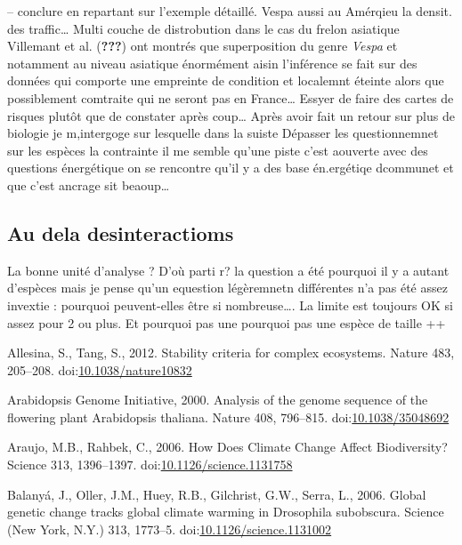 -- conclure en repartant sur l'exemple détaillé. Vespa aussi au Amérqieu
la densit. des traffic\ldots{} Multi couche de distrobution dans le cas
du frelon asiatique Villemant et al. ({\textbf{???}}) ont montrés que
superposition du genre \emph{Vespa} et notamment au niveau asiatique
énormément aisin l'inférence se fait sur des données qui comporte une
empreinte de condition et localemnt éteinte alors que possiblement
comtraite qui ne seront pas en France\ldots{} Essyer de faire des cartes
de risques plutôt que de constater après coup\ldots{} Après avoir fait
un retour sur plus de biologie je m,intergoge sur lesquelle dans la
suiste Dépasser les questionnemnet sur les espèces la contrainte il me
semble qu'une piste c'est aouverte avec des questions énergétique on se
rencontre qu'il y a des base én.ergétiqe dcommunet et que c'est ancrage
sit beaoup\ldots{}

\subsection{Au dela desinteractioms}\label{au-dela-desinteractioms}

La bonne unité d'analyse ? D'où parti r? la question a été pourquoi il y
a autant d'espèces mais je pense qu'un equestion légèremnetn différentes
n'a pas été assez invextie : pourquoi peuvent-elles être si
nombreuse\ldots{}. La limite est toujours OK si assez pour 2 ou plus. Et
pourquoi pas une pourquoi pas une espèce de taille ++

\hypertarget{refs}{}
\hypertarget{ref-Allesina2012a}{}
Allesina, S., Tang, S., 2012. Stability criteria for complex ecosystems.
Nature 483, 205--208.
doi:\href{https://doi.org/10.1038/nature10832}{10.1038/nature10832}

\hypertarget{ref-TheArabidopsisGenomeInitiative2000}{}
Arabidopsis Genome Initiative, 2000. Analysis of the genome sequence of
the flowering plant Arabidopsis thaliana. Nature 408, 796--815.
doi:\href{https://doi.org/10.1038/35048692}{10.1038/35048692}

\hypertarget{ref-Araujo2006}{}
Araujo, M.B., Rahbek, C., 2006. How Does Climate Change Affect
Biodiversity? Science 313, 1396--1397.
doi:\href{https://doi.org/10.1126/science.1131758}{10.1126/science.1131758}

\hypertarget{ref-Balanya2006}{}
Balanyá, J., Oller, J.M., Huey, R.B., Gilchrist, G.W., Serra, L., 2006.
Global genetic change tracks global climate warming in Drosophila
subobscura. Science (New York, N.Y.) 313, 1773--5.
doi:\href{https://doi.org/10.1126/science.1131002}{10.1126/science.1131002}


